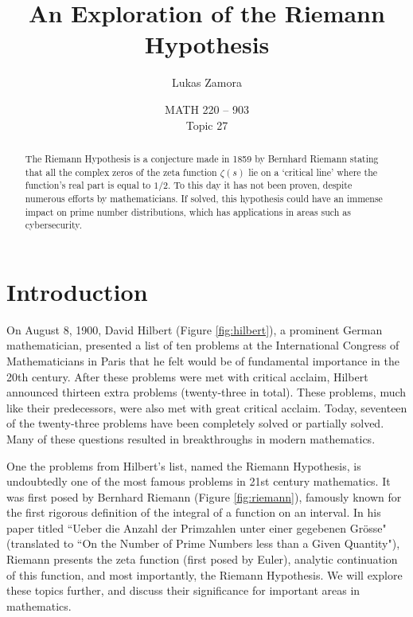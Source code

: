 \documentclass[12pt]{article}
\title{An Exploration of the Riemann Hypothesis}
\author{Lukas Zamora}
\date{MATH 220 -- 903\\Topic 27}
\theoremstyle{plain}
\begin{document}
	\begin{titlingpage}
		\maketitle
		\begin{abstract}
			The Riemann Hypothesis is a conjecture made in 1859 by Bernhard Riemann stating that all the complex zeros of the zeta function $ \zeta(s) $ lie on a `critical line' where the function's real part is equal to $ 1/2 $. To this day it has not been proven, despite numerous efforts by mathematicians. If solved, this hypothesis could have an immense impact on prime number distributions, which has applications in areas such as cybersecurity.
		\end{abstract}
	\end{titlingpage}


	\tableofcontents

	\newpage

	
	\section{Introduction}

	On August 8, 1900, David Hilbert (Figure \ref{fig:hilbert}), a prominent German mathematician, presented a list of ten problems at the International Congress of Mathematicians in Paris that he felt would be of fundamental importance in the 20th century. After these problems were met with critical acclaim, Hilbert announced thirteen extra problems (twenty-three in total). These problems, much like their predecessors, were also met with great critical acclaim. Today, seventeen of the twenty-three problems have been completely solved or partially solved. Many of these questions resulted in breakthroughs in modern mathematics.
	
	One the problems from Hilbert's list, named the Riemann Hypothesis, is undoubtedly one of the most famous problems in 21st century mathematics. It was first posed by Bernhard Riemann (Figure \ref{fig:riemann}), famously known for the first rigorous definition of the integral of a function on an interval. In his paper titled ``Ueber die Anzahl der Primzahlen unter einer gegebenen Gr\"{o}sse" (translated to ``On the Number of Prime Numbers less than a Given Quantity"), Riemann presents the zeta function (first posed by Euler), analytic continuation of this function, and most importantly, the Riemann Hypothesis. We will explore these topics further, and discuss their significance for important areas in mathematics.
	
\end{document}
